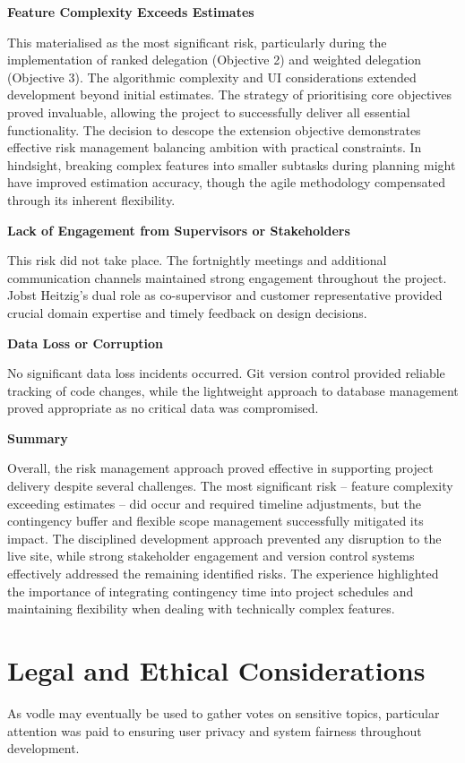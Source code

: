\textbf{Feature Complexity Exceeds Estimates}

This materialised as the most significant risk, particularly during the implementation of ranked delegation (Objective 2) and weighted delegation (Objective 3). The algorithmic complexity and UI considerations extended development beyond initial estimates.
The strategy of prioritising core objectives proved invaluable, allowing the project to successfully deliver all essential functionality. The decision to descope the extension objective demonstrates effective risk management balancing ambition with practical constraints.
In hindsight, breaking complex features into smaller subtasks during planning might have improved estimation accuracy, though the agile methodology compensated through its inherent flexibility.

\textbf{Lack of Engagement from Supervisors or Stakeholders}

This risk did not take place. The fortnightly meetings and additional communication channels maintained strong engagement throughout the project. Jobst Heitzig's dual role as co-supervisor and customer representative provided crucial domain expertise and timely feedback on design decisions.

\textbf{Data Loss or Corruption}

No significant data loss incidents occurred. Git version control provided reliable tracking of code changes, while the lightweight approach to database management proved appropriate as no critical data was compromised.

\textbf{Summary}

Overall, the risk management approach proved effective in supporting project delivery despite several challenges. The most significant risk -- feature complexity exceeding estimates -- did occur and required timeline adjustments, but the contingency buffer and flexible scope management successfully mitigated its impact. The disciplined development approach prevented any disruption to the live site, while strong stakeholder engagement and version control systems effectively addressed the remaining identified risks. The experience highlighted the importance of integrating contingency time into project schedules and maintaining flexibility when dealing with technically complex features.

\section{Legal and Ethical Considerations}
As vodle may eventually be used to gather votes on sensitive topics, particular attention was paid to ensuring user privacy and system fairness throughout development.

